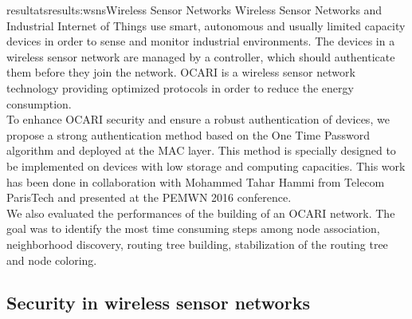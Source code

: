 \documentclass{ra2016}
\begin{document}
\begin{module}{resultats}{results:wsns}{Wireless Sensor Networks}
Wireless Sensor Networks and Industrial Internet
of Things use smart, autonomous and usually limited capacity
devices in order to sense and monitor industrial environments.
The devices in a wireless sensor network are managed by a
controller, which should authenticate them before they join
the network. OCARI is a wireless sensor network technology
providing optimized protocols in order to reduce the energy
consumption.\\ 

To enhance OCARI security and ensure a robust
authentication of devices, we propose a strong authentication
method based on the One Time Password algorithm and deployed
at the MAC layer. This method is specially designed to
be implemented on devices with low storage and computing
capacities.
This work has been done in collaboration with Mohammed Tahar Hammi from Telecom ParisTech and presented at the PEMWN 2016 conference.\\

We also evaluated the performances of the building of an OCARI network. The goal was to identify the most time consuming steps among node association, neighborhood discovery, routing tree building, stabilization of the routing tree and node coloring.\\







\subsection{Security in wireless sensor networks}

\begin{participants}
\end{participants}


\end{module}
\end{document}

